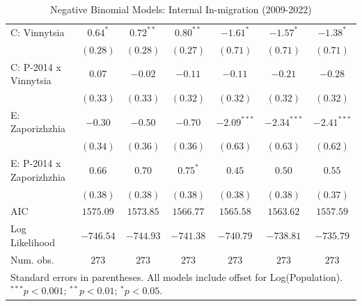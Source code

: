 \begin{table}
\begin{center}
\begin{small}
\begin{tabular}{l c c c c c c}
C: Vinnytsia                & $0.64^{*}$    & $0.72^{**}$   & $0.80^{**}$    & $-1.61^{*}$   & $-1.57^{*}$   & $-1.38^{*}$   \\
                            & $(0.28)$      & $(0.28)$      & $(0.27)$       & $(0.71)$      & $(0.71)$      & $(0.71)$      \\
C: P-2014 x Vinnytsia       & $0.07$        & $-0.02$       & $-0.11$        & $-0.11$       & $-0.21$       & $-0.28$       \\
                            & $(0.33)$      & $(0.33)$      & $(0.32)$       & $(0.32)$      & $(0.32)$      & $(0.32)$      \\
E: Zaporizhzhia             & $-0.30$       & $-0.50$       & $-0.70$        & $-2.09^{***}$ & $-2.34^{***}$ & $-2.41^{***}$ \\
                            & $(0.34)$      & $(0.36)$      & $(0.36)$       & $(0.63)$      & $(0.63)$      & $(0.62)$      \\
E: P-2014 x Zaporizhzhia    & $0.66$        & $0.70$        & $0.75^{*}$     & $0.45$        & $0.50$        & $0.55$        \\
                            & $(0.38)$      & $(0.38)$      & $(0.38)$       & $(0.38)$      & $(0.38)$      & $(0.37)$      \\
\hline
AIC                         & $1575.09$     & $1573.85$     & $1566.77$      & $1565.58$     & $1563.62$     & $1557.59$     \\
Log Likelihood              & $-746.54$     & $-744.93$     & $-741.38$      & $-740.79$     & $-738.81$     & $-735.79$     \\
Num. obs.                   & $273$         & $273$         & $273$          & $273$         & $273$         & $273$         \\
\hline
\multicolumn{7}{l}{\tiny{Standard errors in parentheses. All models include offset for Log(Population). $^{***}p<0.001$; $^{**}p<0.01$; $^{*}p<0.05$.}}
\end{tabular}
\end{small}
\caption{Negative Binomial Models: Internal In-migration (2009-2022)}
\label{tab:in_migration}
\end{center}
\end{table}
